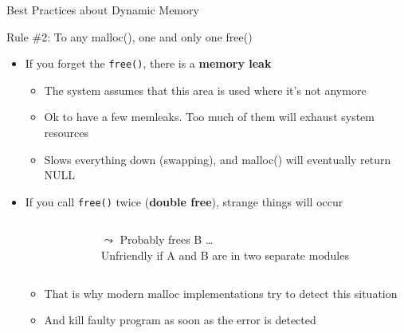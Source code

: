\begin{frame}{Best Practices about Dynamic Memory}
  \begin{block}{\alert{Rule \#2:} To any malloc(), one and only one free()}
    \begin{itemize}

    \item If you forget the \texttt{free()}, there is a \textbf{\alert{memory leak}}
      \begin{itemize}
      \item The system assumes that this area is used where it's not anymore
      \item Ok to have a few memleaks. Too much of them will exhaust system resources
      \item Slows everything down (swapping), and malloc() will eventually return NULL
      \end{itemize}

    \item If you call \texttt{free()} twice (\textbf{\alert{double free}}), strange things will occur

      \begin{columns}
        \begin{column}{.26\linewidth}
          \begin{center}
          \end{center}
        \end{column}
        \begin{column}{.7\linewidth}
          $\leadsto$ Probably frees B \ldots\\
          Unfriendly if A and B are in two separate modules
        \end{column}
      \end{columns}

      \begin{itemize}
      \item That is why modern malloc implementations try to detect this situation
      \item And kill faulty program as soon as the error is detected
      \end{itemize}
    \end{itemize}


  \end{block}
\end{frame}
